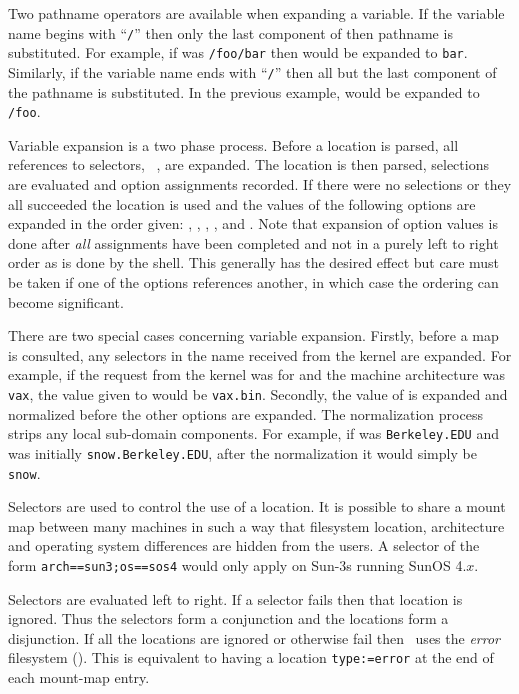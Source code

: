 Two pathname operators are available when expanding a variable.
If the variable name begins with ``{\tt /}'' then only the
last component of then pathname is substituted.  For example,
if  was {\tt /foo/bar} then  would be
expanded to {\tt bar}.
Similarly, if the variable name ends with ``{\tt /}'' then all but
the last component of the pathname is substituted.
In the previous example,  would be expanded to {\tt /foo}.

Variable expansion is a two phase process.  Before a location is parsed, all
references to selectors, \eg\ , are expanded.  The location is then
parsed, selections are evaluated and option assignments recorded.  If there
were no selections or they all succeeded the location is used and the values of
the following options are expanded in the order given:
, , , ,  and .
Note that expansion of option values is done after {\em all} assignments have
been completed and not in a purely left to right order as is done by the shell.
This generally has the desired effect but care must be taken if one of the
options references another, in which case the ordering can become significant.

There are two special cases concerning variable expansion.  Firstly, before a map
is consulted, any selectors in the name received from the kernel are expanded.
For example, if the request from the kernel was for  and the
machine architecture was {\tt vax}, the value given to  would be {\tt vax.bin}.
Secondly, the value of  is expanded and normalized before the other options
are expanded.  The normalization process strips any local sub-domain components.
For example, if  was {\tt Berkeley.EDU} and  was initially
{\tt snow.Berkeley.EDU}, after the normalization it would simply be {\tt snow}.

\label{selectors}

Selectors are used to control the use of a location.
It is possible to share a mount map between many machines in
such a way that filesystem location, architecture and operating
system differences are hidden from the users.
A selector of the form {\tt arch==sun3;os==sos4} would only apply
on Sun-3s running SunOS 4.$x$.

Selectors are evaluated left to right.  If a selector fails then that
location is ignored.  Thus the selectors form a conjunction and the
locations form a disjunction.
If all the locations are ignored or otherwise fail then \amd\ uses
the {\em error} filesystem (\see {}).  This is equivalent
to having a location {\tt type:=error} at the end of each mount-map
entry.

